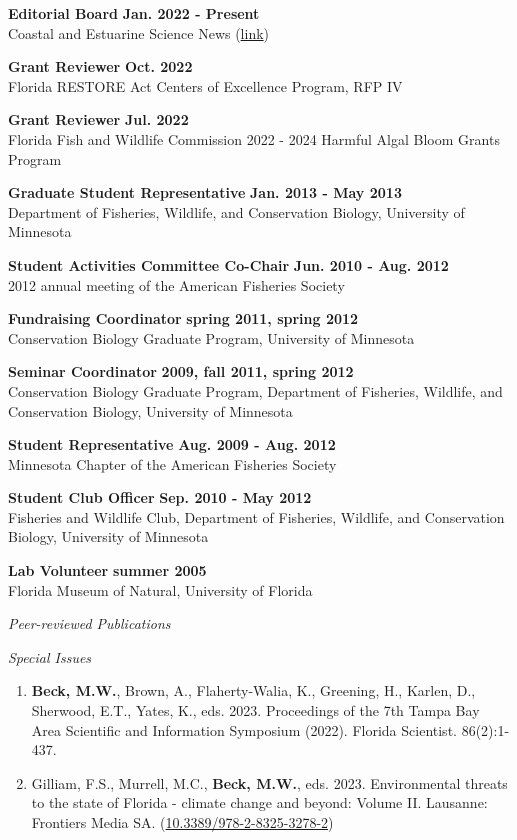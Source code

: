 \documentclass[letterpaper,12pt]{article}
\newcommand{\sectitle}[1]{\vspace{\baselineskip} \centerline{\large{\textit{#1}}}}
\newcommand{\subsectitle}[1]{\vspace{\baselineskip} \centerline{\normalsize{\textit{#1}}}}
\begin{document}
{\bf Editorial Board} \hfill {\bf Jan. 2022 - Present} \\
Coastal and Estuarine Science News (\href{https://www.cerf.science/cesn}{link})

{\bf Grant Reviewer} \hfill {\bf Oct. 2022} \\
Florida RESTORE Act Centers of Excellence Program, RFP IV

{\bf Grant Reviewer} \hfill {\bf Jul. 2022} \\
Florida Fish and Wildlife Commission 2022 - 2024 Harmful Algal Bloom Grants Program

{\bf Graduate Student Representative} \hfill {\bf Jan. 2013 - May 2013} \\
Department of Fisheries, Wildlife, and Conservation Biology, University of Minnesota

{\bf Student Activities Committee Co-Chair} \hfill {\bf Jun. 2010 - Aug. 2012} \\
2012 annual meeting of the American Fisheries Society

{\bf Fundraising Coordinator} \hfill {\bf spring 2011, spring 2012} \\
Conservation Biology Graduate Program, University of Minnesota

{\bf Seminar Coordinator} \hfill {\bf 2009, fall 2011, spring 2012} \\
Conservation Biology Graduate Program, Department of Fisheries, Wildlife, and Conservation Biology, University of Minnesota

{\bf Student Representative} \hfill {\bf Aug. 2009 - Aug. 2012} \\
Minnesota Chapter of the American Fisheries Society

{\bf Student Club Officer} \hfill {\bf Sep. 2010 - May 2012} \\
Fisheries and Wildlife Club, Department of Fisheries, Wildlife, and Conservation Biology, University of Minnesota 

{\bf Lab Volunteer} \hfill {\bf summer 2005} \\
Florida Museum of Natural, University of Florida

\sectitle{Peer-reviewed Publications}

\subsectitle{Special Issues}

\begin{enumerate}

\item \textbf{Beck, M.W.}, Brown, A., Flaherty-Walia, K., Greening, H., Karlen, D., Sherwood, E.T., Yates, K., eds. 2023. Proceedings of the 7th Tampa Bay Area Scientific and Information Symposium (2022). Florida Scientist. 86(2):1-437.

\item Gilliam, F.S., Murrell, M.C., \textbf{Beck, M.W.}, eds. 2023. Environmental threats to the state of Florida - climate change and beyond: Volume II. Lausanne: Frontiers Media SA. ({\footnotesize\href{https://doi.org/10.3389/978-2-8325-3278-2}{10.3389/978-2-8325-3278-2}}) 

\end{enumerate}
\end{document}
